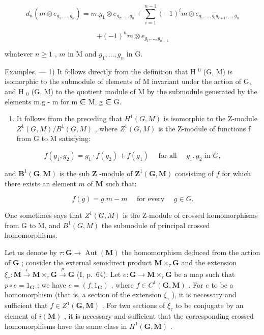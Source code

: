 \[
d _ {n} (m \otimes e _ {g _ {1}, \dots , g _ {n}}) = m. g _ {1} \otimes e _ {g _ {2}, \dots , g _ {n}} + \sum_ {i = 1} ^ {n - 1} (- 1) ^ {i} m \otimes e _ {g _ {1}, \dots , g _ {i} g _ {i + 1}, \dots , g _ {n}}
\]

\[
+ (- 1) ^ {n} m \otimes e _ {g _ {1}, \dots , g _ {n - 1}}
\]

whatever \(n \geqslant 1\) , \(m\) in M and \(g_1, \ldots, g_n\) in G.

Examples. --- 1) It follows directly from the definition that H \(^{0}\) (G, M) is isomorphic to the submodule of elements of M invariant under the action of G, and H \(_{0}\) (G, M) to the quotient module of M by the submodule generated by the elements m.g - m for m ∈ M, g ∈ G.

\begin{enumerate}
\def\labelenumi{\arabic{enumi})}
\setcounter{enumi}{1}
\tightlist
\item
  It follows from the preceding that \(H^{1}(G, M)\) is isomorphic to the Z-module \(Z^{1}(G, M)/B^{1}(G, M)\) , where \(Z^{1}(G, M)\) is the Z-module of functions f from G to M satisfying:
\end{enumerate}

\[
f \left(g _ {1}, g _ {2}\right) = g _ {1} \cdot f \left(g _ {2}\right) + f \left(g _ {1}\right) \quad \text { for   all } \quad g _ {1}, g _ {2} \text { in } G,
\]

and \(\mathbf{B}^{1}(\mathbf{G},\mathbf{M})\) is the sub \(\mathbf{Z}\) -module of \(\mathbf{Z}^{1}(\mathbf{G},\mathbf{M})\) consisting of \(f\) for which there exists an element \(m\) of \(\mathbf{M}\) such that:

\[
f (g) = g. m - m \quad \text { for   every } \quad g \in G.
\]

One sometimes says that \(Z^{1}(G, M)\) is the Z-module of crossed homomorphisms from G to M, and \(B^{1}(G, M)\) the submodule of principal crossed homomorphisms.

Let us denote by \(\tau: \mathbf{G} \to \operatorname{Aut}(\mathbf{M})\) the homomorphism deduced from the action of \(\mathbf{G}\) ; consider the external semidirect product \(\mathbf{M} \times_{\tau} \mathbf{G}\) and the extension \(\xi_{\tau}: \mathbf{M} \xrightarrow{i} \mathbf{M} \times_{\tau} \mathbf{G} \xrightarrow{p} \mathbf{G}\) (I, p.~64). Let \(e: \mathbf{G} \to \mathbf{M} \times_{\tau} \mathbf{G}\) be a map such that \(p \circ e = 1_{\mathbf{G}}\) ; we have \(e = (f, 1_{\mathbf{G}})\) , where \(f \in C^{1}(\mathbf{G}, \mathbf{M})\) . For \(e\) to be a homomorphism (that is, a section of the extension \(\xi_{\tau}\) ), it is necessary and sufficient that \(f \in Z^{1}(\mathbf{G}, \mathbf{M})\) . For two sections of \(\xi_{\tau}\) to be conjugate by an element of \(i(\mathbf{M})\) , it is necessary and sufficient that the corresponding crossed homomorphisms have the same class in \(H^{1}(\mathbf{G}, \mathbf{M})\) .

